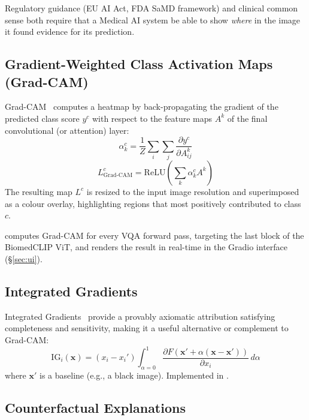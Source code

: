 Regulatory guidance (EU AI Act, FDA SaMD framework) and clinical common
sense both require that a Medical AI system be able to show \emph{where}
in the image it found evidence for its prediction.

\subsection{Gradient-Weighted Class Activation Maps (Grad-CAM)}
\label{subsec:gradcam_lit}

Grad-CAM~\citep{selvaraju2017gradcam} computes a heatmap by
back-propagating the gradient of the predicted class score $y^c$ with
respect to the feature maps $A^k$ of the final convolutional (or attention)
layer:
\begin{equation}
  \alpha_k^c = \frac{1}{Z} \sum_{i} \sum_{j}
               \frac{\partial y^c}{\partial A^k_{ij}}
  \label{eq:alpha}
\end{equation}
\begin{equation}
  L^c_{\mathrm{Grad\text{-}CAM}} =
  \mathrm{ReLU}\!\left(\sum_k \alpha_k^c A^k\right)
  \label{eq:gradcam}
\end{equation}
The resulting map $L^c$ is resized to the input image resolution and
superimposed as a colour overlay, highlighting regions that most
positively contributed to class $c$.

\medxplain{} computes Grad-CAM for every VQA forward pass, targeting the
last block of the BiomedCLIP ViT, and renders the result in real-time
in the Gradio interface (\S\ref{sec:ui}).

\subsection{Integrated Gradients}
\label{subsec:ig}

Integrated Gradients~\citep{sundararajan2017integratedgradients} provide
a provably axiomatic attribution satisfying completeness and sensitivity,
making it a useful alternative or complement to Grad-CAM:
\begin{equation}
  \mathrm{IG}_i(\mathbf{x}) =
  (x_i - x_i') \int_{\alpha=0}^{1}
  \frac{\partial F(\mathbf{x}' + \alpha(\mathbf{x} - \mathbf{x}'))}
       {\partial x_i}\, d\alpha
  \label{eq:ig}
\end{equation}
where $\mathbf{x}'$ is a baseline (e.g., a black image). Implemented in
.

\subsection{Counterfactual Explanations}
\label{subsec:counterfactual}

